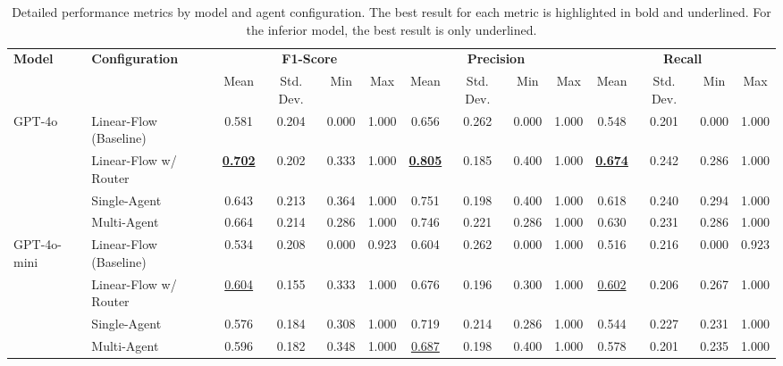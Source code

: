         \begin{landscape}
            \begin{table}[H]
            \centering
            \caption{Detailed performance metrics by model and agent configuration. The best result for each metric is highlighted in bold and underlined. For the inferior model, the best result is only underlined.}
            \label{tab:performance_metrics}
            \begin{tabular}{@{}llcccccccccccc@{}}
                \toprule
                \multirow{2}{*}{\textbf{Model}} & \multirow{2}{*}{\textbf{Configuration}} & \multicolumn{4}{c}{\textbf{F1-Score}} & \multicolumn{4}{c}{\textbf{Precision}} & \multicolumn{4}{c}{\textbf{Recall}} \\
                \cmidrule(l){3-6} \cmidrule(l){7-10} \cmidrule(l){11-14}
                & & Mean & Std. Dev. & Min & Max & Mean & Std. Dev. & Min & Max & Mean & Std. Dev. & Min & Max \\
                \midrule
                \multirow{4}{*}{GPT-4o} & Linear-Flow (Baseline) & 0.581 & 0.204 & 0.000 & 1.000 & 0.656 & 0.262 & 0.000 & 1.000 & 0.548 & 0.201 & 0.000 & 1.000 \\
                & Linear-Flow w/ Router & \textbf{\underline{0.702}} & 0.202 & 0.333 & 1.000 & \textbf{\underline{0.805}} & 0.185 & 0.400 & 1.000 & \textbf{\underline{0.674}} & 0.242 & 0.286 & 1.000 \\
                & Single-Agent & 0.643 & 0.213 & 0.364 & 1.000 & 0.751 & 0.198 & 0.400 & 1.000 & 0.618 & 0.240 & 0.294 & 1.000 \\
                & Multi-Agent & 0.664 & 0.214 & 0.286 & 1.000 & 0.746 & 0.221 & 0.286 & 1.000 & 0.630 & 0.231 & 0.286 & 1.000 \\
                \midrule
                \multirow{4}{*}{GPT-4o-mini} & Linear-Flow (Baseline) & 0.534 & 0.208 & 0.000 & 0.923 & 0.604 & 0.262 & 0.000 & 1.000 & 0.516 & 0.216 & 0.000 & 0.923 \\
                & Linear-Flow w/ Router & \underline{0.604} & 0.155 & 0.333 & 1.000 & 0.676 & 0.196 & 0.300 & 1.000 & \underline{0.602} & 0.206 & 0.267 & 1.000 \\
                & Single-Agent & 0.576 & 0.184 & 0.308 & 1.000 & 0.719 & 0.214 & 0.286 & 1.000 & 0.544 & 0.227 & 0.231 & 1.000 \\
                & Multi-Agent & 0.596 & 0.182 & 0.348 & 1.000 & \underline{0.687} & 0.198 & 0.400 & 1.000 & 0.578 & 0.201 & 0.235 & 1.000 \\
                \bottomrule
            \end{tabular}%
            \end{table}
        \end{landscape}


